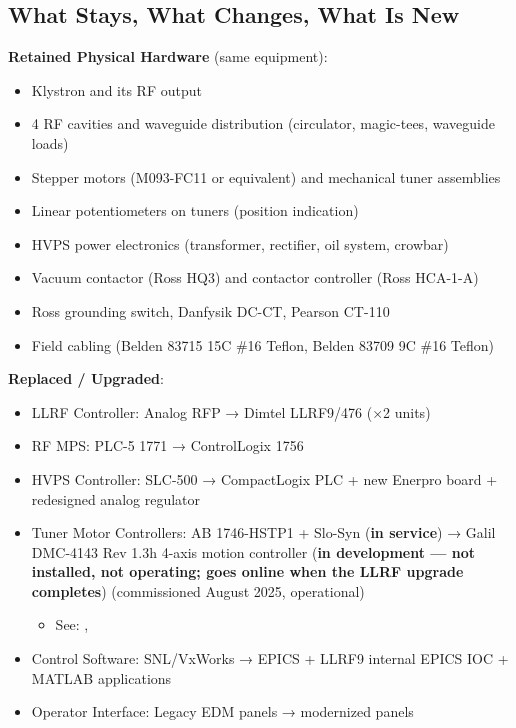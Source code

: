 {\subsection{What Stays, What Changes, What Is New}\label{what-stays-what-changes-what-is-new}

\textbf{Retained Physical Hardware} (same equipment):

\begin{itemize}
\tightlist
\item
  Klystron and its RF output
\item
  4 RF cavities and waveguide distribution (circulator, magic-tees, waveguide loads)
\item
  Stepper motors (M093-FC11 or equivalent) and mechanical tuner assemblies
\item
  Linear potentiometers on tuners (position indication)
\item
  HVPS power electronics (transformer, rectifier, oil system, crowbar)
\item
  Vacuum contactor (Ross HQ3) and contactor controller (Ross HCA-1-A)
\item
  Ross grounding switch, Danfysik DC-CT, Pearson CT-110
\item
  Field cabling (Belden 83715 15C \#16 Teflon, Belden 83709 9C \#16 Teflon)
\end{itemize}

\textbf{Replaced / Upgraded}:

\begin{itemize}
\tightlist
\item
  LLRF Controller: Analog RFP → Dimtel LLRF9/476 (×2 units)
\item
  RF MPS: PLC-5 1771 → ControlLogix 1756
\item
  HVPS Controller: SLC-500 → CompactLogix PLC + new Enerpro board + redesigned analog regulator
\item
  Tuner Motor Controllers: AB 1746-HSTP1 + Slo-Syn (\textbf{in service}) → Galil DMC-4143 Rev 1.3h 4-axis motion controller (\textbf{in development --- not installed, not operating; goes online when the LLRF upgrade completes}) (commissioned August 2025, operational)

  \begin{itemize}
  \tightlist
  \item
    See: , 
  \end{itemize}
\item
  Control Software: SNL/VxWorks → EPICS + LLRF9 internal EPICS IOC + MATLAB applications
\item
  Operator Interface: Legacy EDM panels → modernized panels
\end{itemize}

}
